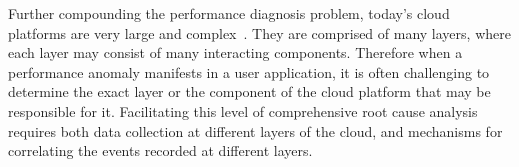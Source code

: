 %

Further compounding the performance
diagnosis problem, today's cloud platforms are very 
large and complex~\cite{DaCunhaRodrigues:2016:MCC:2851613.2851619,Ibidunmoye:2015:PAD:2808687.2791120}. 
They are
comprised of many layers, where each layer may consist of many interacting components.
Therefore when a performance anomaly manifests in a user application, it is
often challenging
to determine the exact layer or the component of the cloud platform that may be responsible for it. 
Facilitating this level of comprehensive root cause analysis requires
both data collection at different layers of the cloud, and mechanisms for correlating 
the events recorded at different layers. 
%
%


